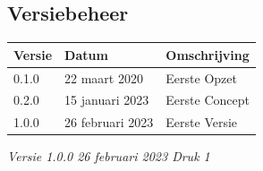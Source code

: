 \subsection*{Versiebeheer}
\begin{table}[H]
	\centering
	\begin{tabular}{l|l|p{8cm}}
		\textbf{Versie} & \textbf{Datum} & \textbf{Omschrijving} \\ \hline
		0.1.0 & 22 maart 2020 & Eerste Opzet  \\ \hline
	    0.2.0 & 15 januari 2023 & Eerste Concept  \\ \hline
	    1.0.0 & 26 februari 2023 & Eerste Versie  \\
	\end{tabular}
\end{table}



\textit{Versie 1.0.0 \hspace{1 cm} 26 februari 2023 \hspace{1cm} Druk 1}